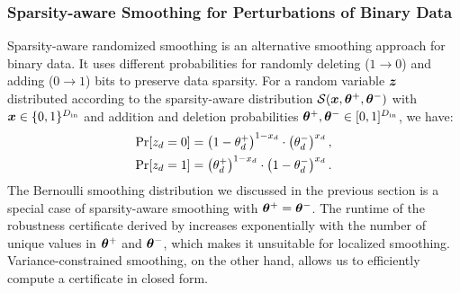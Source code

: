\subsubsection{Sparsity-aware Smoothing for Perturbations of Binary Data}\label{section:appendix_sparsity_cert}
Sparsity-aware randomized smoothing \citep{Bojchevski2020} is an alternative smoothing approach for binary data. It  uses different probabilities for randomly deleting ($1 \rightarrow 0$) and adding ($0 \rightarrow 1$) bits to preserve data sparsity.
For a random variable ${\bm{z}}$ distributed according to the sparsity-aware distribution
$\mathcal{S}({\bm{x}}, {\bm{\theta}}^+, {\bm{\theta}}^-)$ with ${\bm{x}} \in \{0,1\}^{D_\mathrm{in}}$
and addition and deletion probabilities  ${\bm{\theta}}^+,  {\bm{\theta}}^- \in [0,1]^{D_\mathrm{in}}$, we have:
\begin{gather*}
    \Pr[{z}_d =0 ] = \left(1 - {\theta}_d^{+} \right)^{1 - {x}_d} \cdot \left( {\theta}_d^{-} \right)^{{x}_d}, \\
    \Pr[{z}_d =1 ] = \left({\theta}_d^{+} \right)^{1 - {x}_d} \cdot \left( 1 - {\theta}_d^{-} \right)^{{x}_d}.
\end{gather*}
The Bernoulli smoothing distribution we discussed in the previous section is a special case of sparsity-aware smoothing with ${\bm{\theta}}^+ = {\bm{\theta}}^-$.
The runtime of the robustness certificate derived by \citet{Bojchevski2020} increases exponentially with the number of unique values in ${\bm{\theta}}^+$ and ${\bm{\theta}}^-$, which makes it unsuitable for localized smoothing.
Variance-constrained smoothing, on the other hand, allows us to efficiently compute a certificate in closed form.

